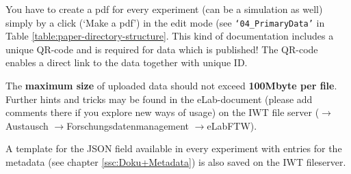 You have to create a pdf for every experiment (can be a simulation as well) simply by a click (`Make a pdf’) in the edit mode (see \texttt{‘04\_PrimaryData’} in Table \ref{table:paper-directory-structure}. This kind of documentation includes a unique QR-code and is required for data which is published! The QR-code enables a direct link to the data together with unique ID.

The \textbf{maximum size} of uploaded data should not exceed
\textbf{100Mbyte per file}. Further hints and tricks may be found in the eLab-document (please add comments there if you explore new ways of usage) on the IWT file server ($\rightarrow$Austausch $\rightarrow$Forschungsdatenmanagement $\rightarrow$eLabFTW).

A template for the JSON field available in every experiment with entries for the metadata (see chapter \ref{ssc:Doku+Metadata}) is also saved on the IWT fileserver.

